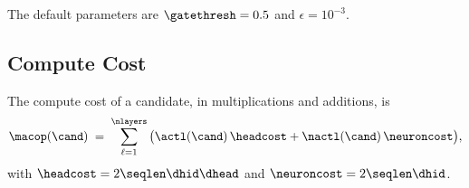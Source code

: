 The default parameters are $\gatethresh = 0.5$ and $\epsilon = 10^{-3}$.

\subsection{Compute Cost}

The compute cost of a candidate, in multiplications and additions, is
\begin{equation}
\macop(\cand) \;=\; \sum_{\ell = 1}^{\nlayers} \big( \actl(\cand) \, \headcost + \nactl(\cand) \, \neuroncost \big),
\end{equation}
with $\headcost = 2 \seqlen \dhid \dhead$ and $\neuroncost = 2 \seqlen \dhid$.
